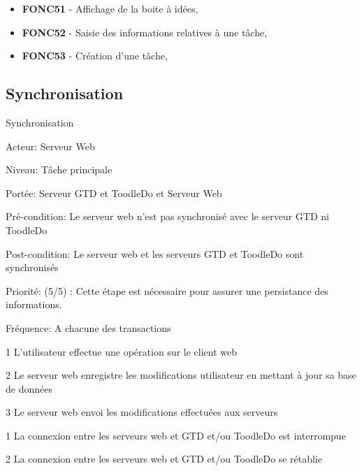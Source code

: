 
\begin{itemize}	\renewcommand{\labelitemi}{}
	\item \textbf{FONC51} - Affichage de la boite à idées,
	\item \textbf{FONC52} - Saisie des informations relatives à une tâche,
	\item \textbf{FONC53} - Création d'une tâche,
\end{itemize}







\subsection{Synchronisation}
\begin{usecase}{Synchronisation}

\begin{information}
\item[Acteur: ] Serveur Web
\item[Niveau:] Tâche principale
\item[Portée:] Serveur GTD et ToodleDo et Serveur Web
\item[Pré-condition:] Le serveur web n'est pas synchronisé avec le serveur GTD ni ToodleDo
\item[Post-condition:] Le serveur web et les serveurs GTD et ToodleDo sont synchronisés
\item[Priorité:] (5/5) : Cette étape est nécessaire pour assurer une persistance des informations.
\item[Fréquence:] A chacune des transactions
\end{information}	

\begin{scenario}
\item[1] L'utilisateur effectue une opération sur le client web
\item[2] Le serveur web enregistre les modifications utilisateur en mettant à jour sa base de données
\item[3] Le serveur web envoi les modifications effectuées aux serveurs
\end{scenario}	

\begin{extension}
	\item[1]La connexion entre les serveurs web et GTD et/ou ToodleDo est interrompue
	\item[2]La connexion entre les serveurs web et GTD et/ou ToodleDo se rétablie
\end{extension}
\end{usecase}

